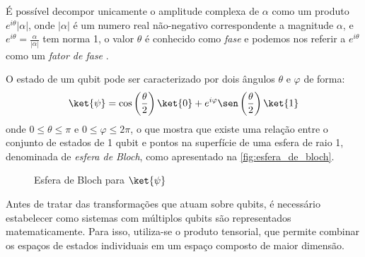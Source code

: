 É possível decompor unicamente o amplitude complexa de $\alpha$ como um produto $e^{i\theta}|\alpha|$, onde $|\alpha|$ é um numero real não-negativo correspondente a magnitude $\alpha$, e $e^{i\theta}=\frac{\alpha}{|\alpha|}$ tem norma 1, o valor $\theta$ é conhecido como \textit{fase} e podemos nos referir a $e^{i\theta}$ como um \textit{fator de fase} \cite{Rieffel2000}.

O estado de um qubit pode ser caracterizado por dois ângulos $\theta$ e $\varphi$ de forma:
$$
    \label{eq:ket_psi}
    \ket{\psi}=\cos\left(\dfrac{\theta}{2}\right)\ket{0}+e^{i\varphi}\sen\left(\dfrac{\theta}{2}\right)\ket{1}
$$
onde $0\leq\theta\leq\pi$ e $0\leq\varphi\leq2\pi$, o que mostra que existe uma relação entre o conjunto de estados de 1 qubit e pontos na superfície de uma esfera de raio 1, denominada de \textit{esfera de Bloch}, como apresentado na \autoref{fig:esfera_de_bloch}.
    

\begin{figure}[htbp]
    \centering
    \caption{Esfera de Bloch para $\ket{\psi}$}    
    \label{fig:esfera_de_bloch}
\end{figure}

Antes de tratar das transformações que atuam sobre qubits, é necessário estabelecer como sistemas com múltiplos qubits são representados matematicamente. Para isso, utiliza-se o produto tensorial, que permite combinar os espaços de estados individuais em um espaço composto de maior dimensão.

